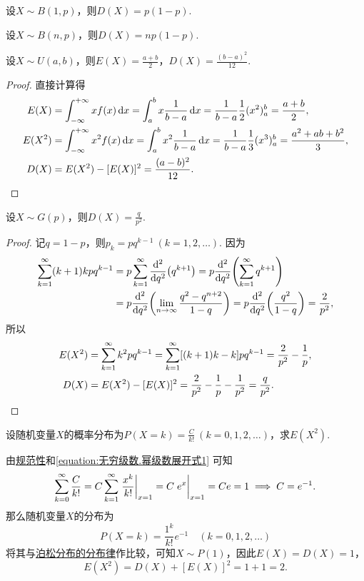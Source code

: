 \begin{theorem}
设\(X \sim B(1,p)\)，则\(D(X) = p(1-p)\).
\end{theorem}

\begin{theorem}
设\(X \sim B(n,p)\)，则\(D(X) = np(1-p)\).
\end{theorem}

\begin{theorem}
设\(X \sim U(a,b)\)，则\(E(X) = \frac{a+b}{2}\)，\(D(X) = \frac{(b-a)^2}{12}\).
\begin{proof}
直接计算得
\begin{align*}
E(X) &= \int_{-\infty}^{+\infty} x f(x) \dd{x}
= \int_a^b x \frac{1}{b-a} \dd{x}
= \frac{1}{b-a} \frac{1}{2} (x^2)_a^b
= \frac{a+b}{2}, \\
E(X^2) &= \int_{-\infty}^{+\infty} x^2 f(x) \dd{x}
= \int_a^b x^2 \frac{1}{b-a} \dd{x}
= \frac{1}{b-a} \frac{1}{3} (x^3)_a^b
= \frac{a^2+ab+b^2}{3}, \\
D(X) &= E(X^2) - [E(X)]^2
= \frac{(a-b)^2}{12}.
\qedhere
\end{align*}
\end{proof}
\end{theorem}

\begin{theorem}\label{theorem:随机变量的数字特征.几何分布的方差}
设\(X \sim G(p)\)，则\(D(X) = \frac{q}{p^2}\).
\begin{proof}
\def\s{\sum\limits_{k=1}^{\infty}}%
\def\l{\lim\limits_{n\to\infty}}%
记\(q = 1-p\)，则\(p_k = pq^{k-1}\ (k=1,2,\dotsc)\).
因为\begin{align*}
\s (k+1)kpq^{k-1}
&= p \s \dv[2]{q}(q^{k+1})
= p \dv[2]{q}(\s q^{k+1}) \\
&= p \dv[2]{q}(\l \frac{q^2-q^{n+2}}{1-q})
= p \dv[2]{q}(\frac{q^2}{1-q})
= \frac{2}{p^2}, \\
\end{align*}所以\begin{align*}
E(X^2) &= \s k^2 pq^{k-1}
= \s [(k+1)k-k] pq^{k-1}
= \frac{2}{p^2} - \frac{1}{p}, \\
D(X) &= E(X^2) - [E(X)]^2
= \frac{2}{p^2} - \frac{1}{p} - \frac{1}{p^2}
= \frac{q}{p^2}.
\qedhere
\end{align*}
\end{proof}
\end{theorem}

\begin{example}
设随机变量\(X\)的概率分布为\(P(X=k) = \frac{C}{k!}\ (k=0,1,2,\dotsc)\)，求\(E(X^2)\).
\begin{solution}
由\hyperref[theorem:随机变量及其分布.离散型随机变量的密度函数的性质]{规范性}和\cref{equation:无穷级数.幂级数展开式1} 可知\[
\sum\limits_{k=0}^{\infty} \frac{C}{k!}
= C \sum\limits_{k=1}^{\infty} \eval{\frac{x^k}{k!}}_{x=1}
= C \eval{e^x}_{x=1}
= C e = 1
\implies
C = e^{-1}.
\]那么随机变量\(X\)的分布为\[
P(X=k) = \frac{1^k}{k!} e^{-1} \quad(k=0,1,2,\dotsc)
\]将其与\hyperref[equation:随机变量及其分布.泊松分布的分布律]{泊松分布的分布律}作比较，可知\(X \sim P(1)\)，因此\(E(X) = D(X) = 1\)，\[
E(X^2) = D(X) + [E(X)]^2 = 1 + 1 = 2.
\]
\end{solution}
\end{example}

